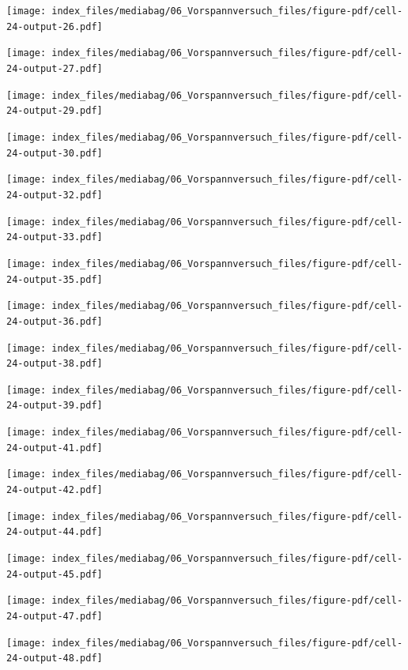 \documentclass[
  11pt,
  letterpaper,
]{scrreprt}
\begin{document}
\newpage{}

\texttt{[image: index\_files/mediabag/06\_Vorspannversuch\_files/figure-pdf/cell-24-output-26.pdf]}

\texttt{[image: index\_files/mediabag/06\_Vorspannversuch\_files/figure-pdf/cell-24-output-27.pdf]}

\newpage{}

\texttt{[image: index\_files/mediabag/06\_Vorspannversuch\_files/figure-pdf/cell-24-output-29.pdf]}

\texttt{[image: index\_files/mediabag/06\_Vorspannversuch\_files/figure-pdf/cell-24-output-30.pdf]}

\newpage{}

\texttt{[image: index\_files/mediabag/06\_Vorspannversuch\_files/figure-pdf/cell-24-output-32.pdf]}

\texttt{[image: index\_files/mediabag/06\_Vorspannversuch\_files/figure-pdf/cell-24-output-33.pdf]}

\newpage{}

\texttt{[image: index\_files/mediabag/06\_Vorspannversuch\_files/figure-pdf/cell-24-output-35.pdf]}

\texttt{[image: index\_files/mediabag/06\_Vorspannversuch\_files/figure-pdf/cell-24-output-36.pdf]}

\newpage{}

\texttt{[image: index\_files/mediabag/06\_Vorspannversuch\_files/figure-pdf/cell-24-output-38.pdf]}

\texttt{[image: index\_files/mediabag/06\_Vorspannversuch\_files/figure-pdf/cell-24-output-39.pdf]}

\newpage{}

\texttt{[image: index\_files/mediabag/06\_Vorspannversuch\_files/figure-pdf/cell-24-output-41.pdf]}

\texttt{[image: index\_files/mediabag/06\_Vorspannversuch\_files/figure-pdf/cell-24-output-42.pdf]}

\newpage{}

\texttt{[image: index\_files/mediabag/06\_Vorspannversuch\_files/figure-pdf/cell-24-output-44.pdf]}

\texttt{[image: index\_files/mediabag/06\_Vorspannversuch\_files/figure-pdf/cell-24-output-45.pdf]}

\newpage{}

\texttt{[image: index\_files/mediabag/06\_Vorspannversuch\_files/figure-pdf/cell-24-output-47.pdf]}

\texttt{[image: index\_files/mediabag/06\_Vorspannversuch\_files/figure-pdf/cell-24-output-48.pdf]}
\end{document}
